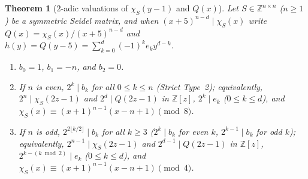 \documentclass[11pt,reqno]{amsart}
\newtheorem{theorem}{Theorem}[section]
\theoremstyle{definition}
\theoremstyle{remark}
\numberwithin{equation}{section}
\numberwithin{table}{section}
\begin{document}
\begin{theorem}[$2$-adic valuations of $\chi_S(y - 1)$ and $Q(x)$]\label{thm:twoadic_val}
Let $S \in \mathbb{Z}^{n \times n}$ ($n \ge 1$) be a symmetric Seidel matrix, and when $(x + 5)^{n - d} \mid \chi_S(x)$ write $Q(x) = \chi_S(x)/(x + 5)^{n - d}$ and $h(y) = Q(y - 5) = \sum_{k=0}^d (-1)^k e_k y^{d - k}$.
\begin{enumerate}
  \item $b_0 = 1$, $b_1 = -n$, and $b_2 = 0$.
  \item If $n$ is \emph{even}, $2^k \mid b_k$ for all $0 \le k \le n$ (\emph{Strict Type~2}); equivalently, $2^n \mid \chi_S(2z - 1)$ and $2^d \mid Q(2z - 1)$ in $\mathbb{Z}[z]$, $2^k \mid e_k$ ($0 \le k \le d$), and $\chi_S(x) \equiv (x+1)^{n-1}(x - n + 1) \pmod 8$.
  \item If $n$ is \emph{odd}, $2^{2\lfloor k/2 \rfloor} \mid b_k$ for all $k \ge 3$ ($2^k \mid b_k$ for even $k$, $2^{k-1} \mid b_k$ for odd $k$); equivalently, $2^{n-1} \mid \chi_S(2z - 1)$ and $2^{d-1} \mid Q(2z - 1)$ in $\mathbb{Z}[z]$, $2^{k - (k \bmod 2)} \mid e_k$ ($0 \le k \le d$), and $\chi_S(x) \equiv (x+1)^{n-1}(x - n + 1) \pmod 4$.
\end{enumerate}
\end{theorem}
\end{document}
